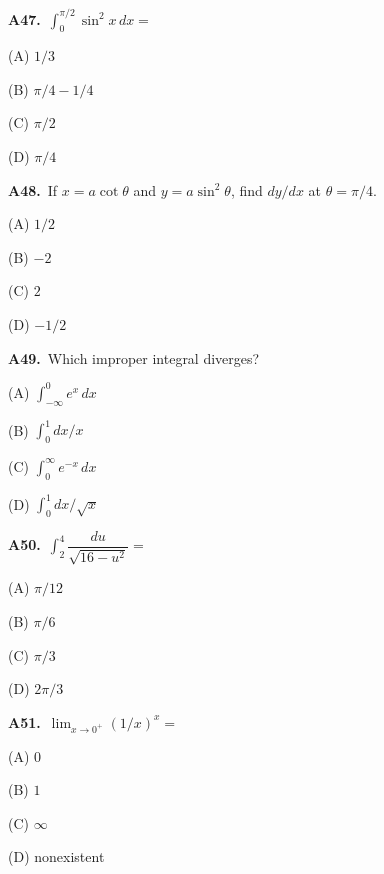 \documentclass[11pt]{article}
\begin{document}
\bigskip\noindent\textbf{A47.}\ $\int_0^{\pi/2}\sin^2x\,dx=$
\begin{list}{}{\setlength{\leftmargin}{3em}\setlength{\labelwidth}{2.5em}\setlength{\itemsep}{0pt}\setlength{\topsep}{2pt}}
\item[(A)] $1/3$
\item[(B)] $\pi/4-1/4$
\item[(C)] $\pi/2$
\item[(D)] $\pi/4$
\end{list}

\bigskip\noindent\textbf{A48.}\ If $x=a\cot\theta$ and $y=a\sin^2\theta$, find $dy/dx$ at $\theta=\pi/4$.
\begin{list}{}{\setlength{\leftmargin}{3em}\setlength{\labelwidth}{2.5em}\setlength{\itemsep}{0pt}\setlength{\topsep}{2pt}}
\item[(A)] $1/2$
\item[(B)] $-2$
\item[(C)] $2$
\item[(D)] $-1/2$
\end{list}

\bigskip\noindent\textbf{A49.}\ Which improper integral diverges?
\begin{list}{}{\setlength{\leftmargin}{3em}\setlength{\labelwidth}{2.5em}\setlength{\itemsep}{0pt}\setlength{\topsep}{2pt}}
\item[(A)] $\int_{-\infty}^0e^x\,dx$
\item[(B)] $\int_0^1dx/x$
\item[(C)] $\int_0^\infty e^{-x}\,dx$
\item[(D)] $\int_0^1dx/\sqrt x$
\end{list}

\bigskip\noindent\textbf{A50.}\ $\int_2^4\dfrac{du}{\sqrt{16-u^2}}=$
\begin{list}{}{\setlength{\leftmargin}{3em}\setlength{\labelwidth}{2.5em}\setlength{\itemsep}{0pt}\setlength{\topsep}{2pt}}
\item[(A)] $\pi/12$
\item[(B)] $\pi/6$
\item[(C)] $\pi/3$
\item[(D)] $2\pi/3$
\end{list}

\bigskip\noindent\textbf{A51.}\ $\lim_{x\to0^+}(1/x)^x=$
\begin{list}{}{\setlength{\leftmargin}{3em}\setlength{\labelwidth}{2.5em}\setlength{\itemsep}{0pt}\setlength{\topsep}{2pt}}
\item[(A)] $0$
\item[(B)] $1$
\item[(C)] $\infty$
\item[(D)] nonexistent
\end{list}
\end{document}
